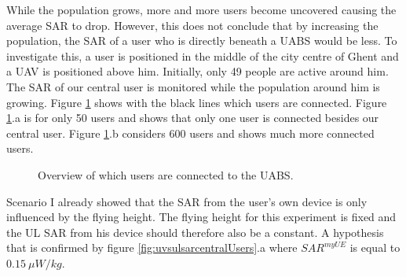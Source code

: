 While the population grows, more and more users become uncovered causing the average SAR to drop. 
However, this does not conclude that  by increasing the population, the SAR of a user who is directly beneath a \gls{UABS} would be less.
To investigate this, a user is positioned in the middle of the city centre of Ghent and a \gls{UAV} is positioned above him. Initially, only 
49 people are active around him. The \gls{SAR} of our central user is monitored while the population around him is growing.
Figure \ref{fig:connectionMap} shows with the black lines which users are connected. Figure \ref{fig:connectionMap}.a is for only 50 users and 
shows that only one user is connected besides our central user. Figure \ref{fig:connectionMap}.b considers 600 users and shows much more connected users.
\begin{figure}[h]
\hfill
{}
\caption{Overview of which users are connected to the \acs{UABS}.}
  \label{fig:connectionMap}
\end{figure}
Scenario I already showed that the \gls{SAR} from the user's own device is only influenced by the flying height. 
The flying height for this experiment is fixed and the \gls{UL} \gls{SAR} from his device should therefore also be a constant. 
A hypothesis that is confirmed by figure \ref{fig:uvsulsarcentralUsers}.a where $SAR^{myUE}$ is equal to $0.15\ \mu W/kg$.
